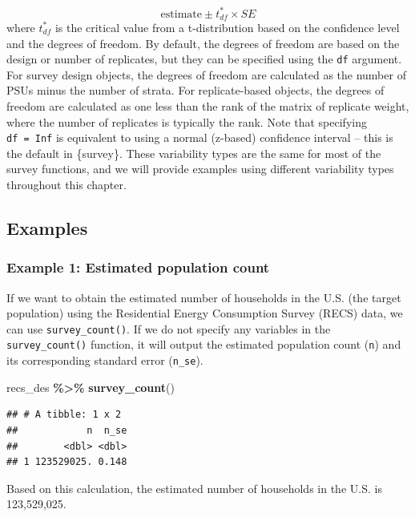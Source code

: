 \documentclass[
]{krantz}
\makeatletter
\newenvironment{Shaded}{\begin{snugshade}}{\end{snugshade}}
\newcommand{\FunctionTok}[1]{\textcolor[rgb]{0.27,0.27,0.27}{\textbf{#1}}}
\newcommand{\NormalTok}[1]{#1}
\newcommand{\SpecialCharTok}[1]{\textcolor[rgb]{0.43,0.43,0.43}{\textbf{#1}}}
\newenvironment{kframe}{%
\medskip{}
\setlength{\fboxsep}{.8em}
 \def\at@end@of@kframe{}%
 \ifinner\ifhmode%
  \def\at@end@of@kframe{\end{minipage}}%
  \begin{minipage}{\columnwidth}%
 \fi\fi%
 \def\FrameCommand##1{\hskip\@totalleftmargin \hskip-\fboxsep
 \colorbox{shadecolor}{##1}\hskip-\fboxsep
     \hskip-\linewidth \hskip-\@totalleftmargin \hskip\columnwidth}%
 \MakeFramed {\advance\hsize-\width
   \@totalleftmargin\z@ \linewidth\hsize
   \@setminipage}}%
 {\par\unskip\endMakeFramed%
 \at@end@of@kframe}
\renewenvironment{Shaded}{\begin{kframe}}{\end{kframe}}
\makeatother
\begin{document}
\[ \text{estimate} \pm t^*_{df}\times SE\]
where \(t^*_{df}\) is the critical value from a t-distribution based on the confidence level and the degrees of freedom. By default, the degrees of freedom are based on the design or number of replicates, but they can be specified using the \texttt{df} argument. For survey design objects, the degrees of freedom are calculated as the number of PSUs minus the number of strata. For replicate-based objects, the degrees of freedom are calculated as one less than the rank of the matrix of replicate weight, where the number of replicates is typically the rank. Note that specifying \texttt{df\ =\ Inf} is equivalent to using a normal (z-based) confidence interval -- this is the default in \{survey\}. These variability types are the same for most of the survey functions, and we will provide examples using different variability types throughout this chapter.

\hypertarget{examples}{%
\subsection{Examples}\label{examples}}

\hypertarget{example-1-estimated-population-count}{%
\subsubsection*{Example 1: Estimated population count}\label{example-1-estimated-population-count}}


If we want to obtain the estimated number of households in the U.S. (the target population) using the Residential Energy Consumption Survey (RECS) data, we can use \texttt{survey\_count()}. If we do not specify any variables in the \texttt{survey\_count()} function, it will output the estimated population count (\texttt{n}) and its corresponding standard error (\texttt{n\_se}).

\begin{Shaded}
\begin{Highlighting}[]
\NormalTok{recs\_des }\SpecialCharTok{\%\textgreater{}\%}
  \FunctionTok{survey\_count}\NormalTok{()}
\end{Highlighting}
\end{Shaded}

\begin{verbatim}
## # A tibble: 1 x 2
##            n  n_se
##        <dbl> <dbl>
## 1 123529025. 0.148
\end{verbatim}

Based on this calculation, the estimated number of households in the U.S. is 123,529,025.
\end{document}
